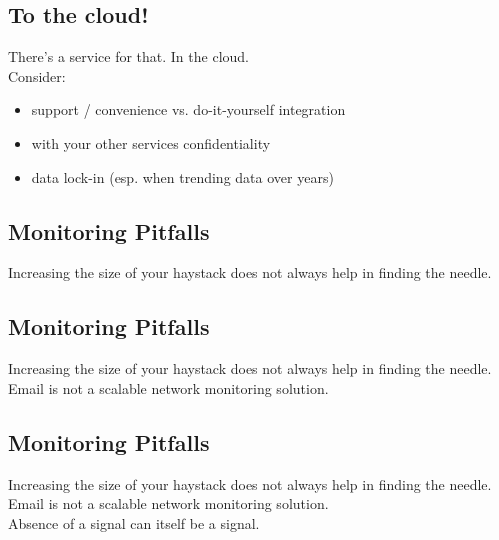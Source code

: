 \documentclass[xga]{xdvislides}
\begin{document}
\subsection{To the cloud!}
There’s a service for that. In the cloud. \\

Consider:
\begin{itemize}
	\item support / convenience vs. do-it-yourself integration
	\item with your other services confidentiality
	\item data lock-in (esp. when trending data over years)
\end{itemize}

\subsection{Monitoring Pitfalls}
\vspace*{\fill}
\Huge
\begin{center}
Increasing the size of your haystack does not always
help in finding the needle.
\end{center}
\Normalsize
\vspace*{\fill}

\subsection{Monitoring Pitfalls}
\vspace*{\fill}
\Huge
\begin{center}
Increasing the size of your haystack does not always
help in finding the needle. \\
\vspace{.4in}
Email is not a scalable network monitoring solution.
\end{center}
\Normalsize
\vspace*{\fill}

\subsection{Monitoring Pitfalls}
\vspace*{\fill}
\Huge
\begin{center}
Increasing the size of your haystack does not always
help in finding the needle. \\
\vspace{.4in}
Email is not a scalable network monitoring solution. \\
\vspace{.4in}
Absence of a signal can itself be a signal.
\end{center}
\Normalsize
\vspace*{\fill}
\end{document}
